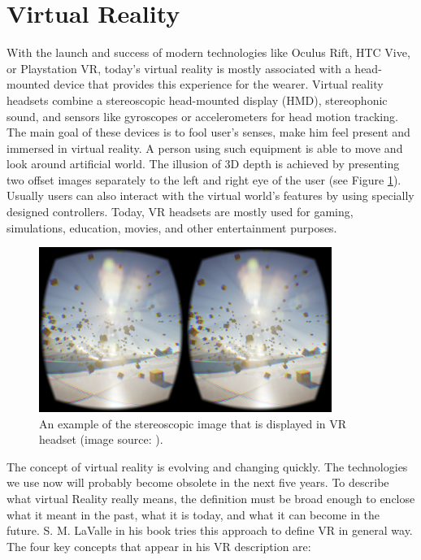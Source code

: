 \section{Virtual Reality}

With the launch and success of modern technologies like Oculus Rift, HTC Vive, or Playstation VR, today’s virtual reality is mostly associated with a head-mounted device that provides this experience for the wearer. Virtual reality headsets combine a stereoscopic head-mounted display (HMD), stereophonic sound, and sensors like gyroscopes or accelerometers for head motion tracking. The main goal of these devices is to fool user’s senses, make him feel present and immersed in virtual reality. A person using such equipment is able to move and look around artificial world. The illusion of 3D depth is achieved by presenting two offset images separately to the left and right eye of the user (see Figure \ref{fig:STEREOSCOPIC}). Usually users can also interact with the virtual world's features by using specially designed controllers. Today, VR headsets are mostly used for gaming, simulations, education, movies, and other entertainment purposes.

\begin{figure}[th]
\centering
\includegraphics[width=0.85\textwidth]{img/stereoscopic.jpg}
\caption{An example of the stereoscopic image that is displayed in VR headset (image source: \cite{STEREOSCOPIC_IMAGE}).}
\label{fig:STEREOSCOPIC}
\end{figure}

The concept of virtual reality is evolving and changing quickly. The technologies we use now will probably become obsolete in the next five years. To describe what virtual Reality really means, the definition must be broad enough to enclose what it meant in the past, what it is today, and what it can become in the future. S. M. LaValle in his book \cite{VR_BOOK} tries this approach to define VR in general way. The four key concepts that appear in his VR description are:

